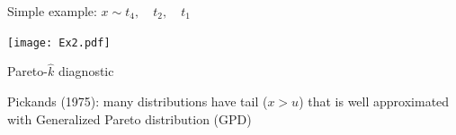 \documentclass[english,t]{beamer}
\begin{document}
\begin{frame}{Simple example: $x \sim t_4, \quad t_2, \quad t_1$}

\vspace{-0.5\baselineskip}
\hspace{-1cm}
\begin{minipage}[t]{1.0\linewidth}
\texttt{[image: Ex2.pdf]}%
\end{minipage}

\hspace{-1cm}

\end{frame}



  

\begin{frame}{Pareto-$\hat{k}$ diagnostic}

   Pickands (1975): many distributions have tail ($x > u$) that
    is well approximated with Generalized Pareto distribution (GPD)

    {
      \vspace{-0.5\baselineskip}
}

\end{frame}
\end{document}
